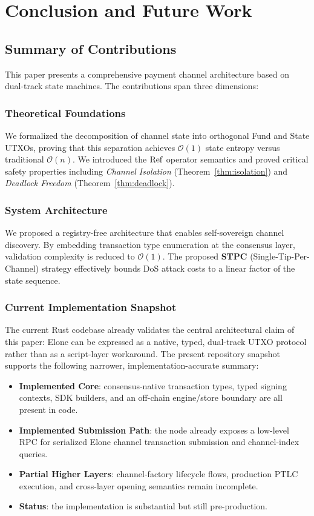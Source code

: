 \section{Conclusion and Future Work}

\subsection{Summary of Contributions}

This paper presents a comprehensive payment channel architecture based on dual-track state machines. The contributions span three dimensions:

\subsubsection{Theoretical Foundations}
We formalized the decomposition of channel state into orthogonal Fund and State UTXOs, proving that this separation achieves $\mathcal{O}(1)$ state entropy versus traditional $\mathcal{O}(n)$. We introduced the $\operatorname{Ref}$ operator semantics and proved critical safety properties including \textit{Channel Isolation} (Theorem~\ref{thm:isolation}) and \textit{Deadlock Freedom} (Theorem~\ref{thm:deadlock}).

\subsubsection{System Architecture}
We proposed a registry-free architecture that enables self-sovereign channel discovery. By embedding transaction type enumeration at the consensus layer, validation complexity is reduced to $\mathcal{O}(1)$. The proposed \textbf{STPC} (Single-Tip-Per-Channel) strategy effectively bounds DoS attack costs to a linear factor of the state sequence.

\subsubsection{Current Implementation Snapshot}
The current Rust codebase already validates the central architectural claim of this paper: Elone can be expressed as a native, typed, dual-track UTXO protocol rather than as a script-layer workaround. The present repository snapshot supports the following narrower, implementation-accurate summary:
\begin{itemize}
    \item \textbf{Implemented Core}: consensus-native transaction types, typed signing contexts, SDK builders, and an off-chain engine/store boundary are all present in code.
    \item \textbf{Implemented Submission Path}: the node already exposes a low-level RPC for serialized Elone channel transaction submission and channel-index queries.
    \item \textbf{Partial Higher Layers}: channel-factory lifecycle flows, production PTLC execution, and cross-layer opening semantics remain incomplete.
    \item \textbf{Status}: the implementation is substantial but still pre-production.
\end{itemize}


